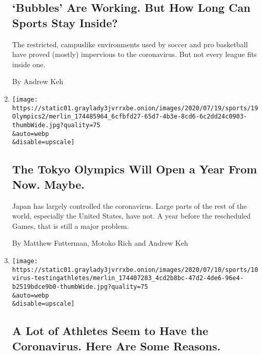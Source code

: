 \begin{enumerate}
  \hypertarget{bubbles-are-working-but-how-long-can-sports-stay-inside}{%
  \subsection{`Bubbles' Are Working. But How Long Can Sports Stay
  Inside?}\label{bubbles-are-working-but-how-long-can-sports-stay-inside}}

  The restricted, campuslike environments used by soccer and pro
  basketball have proved (mostly) impervious to the coronavirus. But not
  every league fits inside one.

  By Andrew Keh
\item
  \href{/2020/07/19/sports/2021-tokyo-olympics-protocols.html}{}

  \texttt{[image: https://static01.graylady3jvrrxbe.onion/images/2020/07/19/sports/19Olympics2/merlin\_174485964\_6cfbfd27-65d7-4b3e-8cd6-6c2dd24c0903-thumbWide.jpg?quality=75\\\&auto=webp\\\&disable=upscale]}

  \hypertarget{the-tokyo-olympics-will-open-a-year-from-now-maybe}{%
  \subsection{The Tokyo Olympics Will Open a Year From Now.
  Maybe.}\label{the-tokyo-olympics-will-open-a-year-from-now-maybe}}

  Japan has largely controlled the coronavirus. Large parts of the rest
  of the world, especially the United States, have not. A year before
  the rescheduled Games, that is still a major problem.

  By Matthew Futterman, Motoko Rich and Andrew Keh
\item
  \href{/2020/07/10/sports/coronavirus-athletes-tested-positive.html}{}

  \texttt{[image: https://static01.graylady3jvrrxbe.onion/images/2020/07/10/sports/10virus-testingathletes/merlin\_174407283\_4cd2b8bc-47d2-4de6-96e4-b2519bdce9b0-thumbWide.jpg?quality=75\\\&auto=webp\\\&disable=upscale]}

  \hypertarget{a-lot-of-athletes-seem-to-have-the-coronavirus-here-are-some-reasons}{%
  \subsection{A Lot of Athletes Seem to Have the Coronavirus. Here Are
  Some
  Reasons.}\label{a-lot-of-athletes-seem-to-have-the-coronavirus-here-are-some-reasons}}


\end{enumerate}
